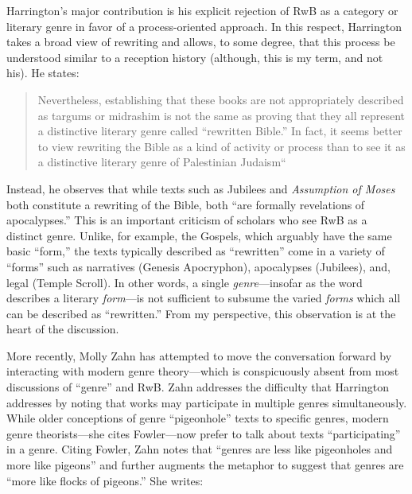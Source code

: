 Harrington's major contribution is his explicit rejection of RwB as a
category or literary genre in favor of a process-oriented approach. In
this respect, Harrington takes a broad view of rewriting and allows, to
some degree, that this process be understood similar to a reception
history (although, this is my term, and not his). He states:

\begin{quote}
Nevertheless, establishing that these books are not appropriately
described as targums or midrashim is not the same as proving that they
all represent a distinctive literary genre called ``rewritten Bible.''
In fact, it seems better to view rewriting the Bible as a kind of
activity or process than to see it as a distinctive literary genre of
Palestinian
Judaism``\autocite[242--243]{harrington_kraft-nickelsburg1986}
\end{quote}

Instead, he observes that while texts such as Jubilees and
\emph{Assumption of Moses} both constitute a rewriting of the Bible,
both ``are formally revelations of
apocalypses.''\autocite[243]{harrington_kraft-nickelsburg1986} This is
an important criticism of scholars who see RwB as a distinct genre.
Unlike, for example, the Gospels, which arguably have the same basic
``form,'' the texts typically described as ``rewritten'' come in a
variety of ``forms'' such as narratives (Genesis Apocryphon),
apocalypses (Jubilees), and, legal (Temple Scroll). In other words, a
single \emph{genre}---insofar as the word describes a literary
\emph{form}---is not sufficient to subsume the varied \emph{forms} which
all can be described as ``rewritten.'' From my perspective, this
observation is at the heart of the discussion.

More recently, Molly Zahn has attempted to move the conversation forward
by interacting with modern genre theory---which is conspicuously absent
from most discussions of ``genre'' and
RwB.\autocites{zahn_jbl2012}[Daniel Machiela noted the absence of genre
theory in his 2010 article, as well, see][]{machiela_jjs2010}[Notable
exceptions include][]{brooke_dsd2010} Zahn addresses the difficulty that
Harrington addresses by noting that works may participate in multiple
genres simultaneously. While older conceptions of genre ``pigeonhole''
texts to specific genres, modern genre theorists---she cites
Fowler---now prefer to talk about texts ``participating'' in a genre.
Citing Fowler, Zahn notes that ``genres are less like pigeonholes and
more like pigeons'' and further augments the metaphor to suggest that
genres are ``more like flocks of pigeons.'' She writes:

